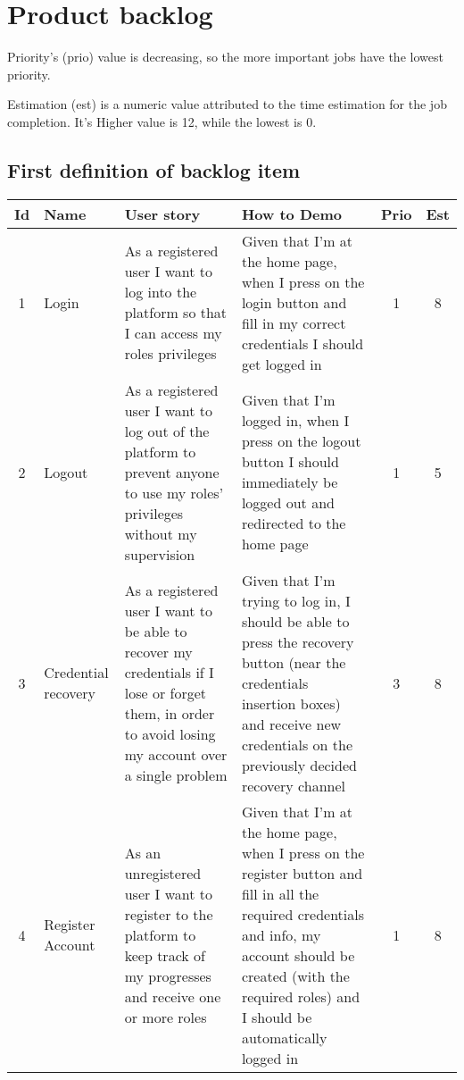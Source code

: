 \section{Product backlog} \label{product_backlog}
Priority's (prio) value is decreasing, so the more important jobs have the lowest priority.

Estimation (est) is a numeric value attributed to the time estimation for the job completion. It's Higher value is 12, while the lowest is 0.

\newpage
\subsection{First definition of backlog item}
\begin{tabular}{|c|m{1.5cm}|m{4cm}|m{4cm}|c|c|}
	\hline
	\textbf{Id}&\textbf{Name}&\textbf{User story}&\textbf{How to Demo}&\textbf{Prio}&\textbf{Est}\\
	\hline
	1 & Login & 
	As a registered user I want to log into the platform so that I can access my roles privileges & 
	Given that I'm at the home page, when I press on the login button and fill in my correct credentials I should get logged in &
	1 & 8 \\
	\hline
	2 & Logout & 
	As a registered user I want to log out of the platform to prevent anyone to use my roles' privileges without my supervision & 
	Given that I'm logged in, when I press on the logout button I should immediately be logged out and redirected to the home page &
	1 & 5 \\
	\hline
	3 & Credential recovery & 
	As a registered user I want to be able to recover my credentials if I lose or forget them, in order to avoid losing my account over a single problem & 
	Given that I'm trying to log in, I should be able to press the recovery button (near the credentials insertion boxes) and receive new credentials on the previously decided recovery channel &
	3 & 8 \\
	\hline
	4 & Register Account & 
	As an unregistered user I want to register to the platform to keep track of my progresses and receive one or more roles & 
	Given that I'm at the home page, when I press on the register button and fill in all the required credentials and info, my account should be created (with the required roles) and I should be automatically logged in &
	1 & 8 \\

\end{tabular}
